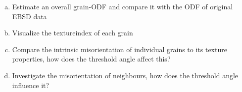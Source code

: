\begin{frame}



  \begin{Exercise}
    \begin{enumerate}[a)]
    \item Estimate an overall grain-ODF and compare it with the ODF of
      original EBSD data
    \item Visualize the textureindex of each grain
    \item Compare the intrinsic misorientation of individual grains to its
      texture properties, how does the threshold angle affect this?
    \item Investigate the misorientation of neighbours, how does the threshold
      angle influence it?
    \end{enumerate}
  \end{Exercise}

\end{frame}



